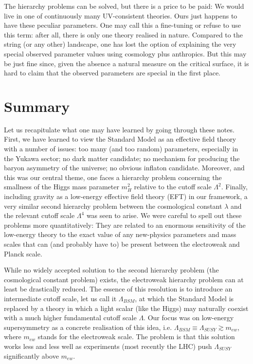 \documentclass[12pt]{article}
\numberwithin{equation}{section}
\begin{document}
The hierarchy problems can be solved, but there is a price to be paid: We would live in one of continuously many UV-consistent theories. Ours just happens to have these peculiar parameters. One may call this a fine-tuning or refuse to use this term: after all, there is only one theory realised in nature. Compared to the string (or any other) landscape, one has lost the option of explaining the very special observed parameter values using cosmology plus anthropics. But this may be just fine since, given the absence a natural measure on the critical surface, it is hard to claim that the observed parameters are special in the first place.






\section{Summary}\label{summ}
Let us recapitulate what one may have learned by going through these notes. First, we have learned to view the Standard Model as an effective field theory with a number of issues: too many (and too random) parameters, especially in the Yukawa sector; no dark matter candidate; no mechanism for producing the baryon asymmetry of the universe; no obvious inflaton candidate. Moreover, and this was our central theme, one faces a hierarchy problem concerning the smallness of the Higgs mass parameter $m_H^2$ relative to the cutoff scale $\Lambda^2$. Finally, including gravity as a low-energy effective field theory (EFT) in our framework, a very similar second hierarchy problem between the cosmological constant $\lambda$ and the relevant cutoff scale $\Lambda^4$ was seen to arise. We were careful to spell out these problems more quantitatively: They are related to an enormous sensitivity of the low-energy theory to the exact value of any new-physics parameters and mass scales that can (and probably have to) be present between the electroweak and Planck scale.

While no widely accepted solution to the second hierarchy problem (the cosmological constant problem) exists, the electroweak hierarchy problem can at least be drastically reduced. The essence of this resolution is to introduce an intermediate cutoff scale, let us call it $\Lambda_{BSM}$, at which the Standard Model is replaced by a theory in which a light scalar (like the Higgs) may naturally coexist with a much higher fundamental cutoff scale $\Lambda$. Our focus was on low-energy supersymmetry as a concrete realisation of this idea, i.e. $\Lambda_{BSM}\equiv \Lambda_{SUSY}\gtrsim m_{ew}$, where $m_{ew}$ stands for the electroweak scale. The problem is that this solution works less and less well as experiments (most recently the LHC) push $\Lambda_{SUSY}$ significantly above $m_{ew}$.
\end{document}
